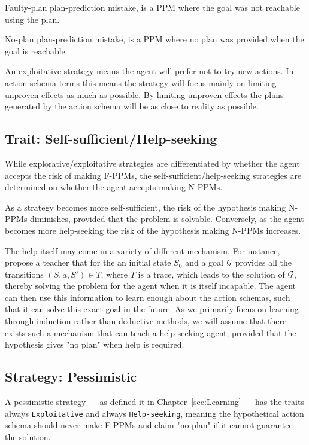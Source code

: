 \documentclass[\master/Master.tex]{subfiles}
\begin{document}
	\begin{definition} 
		[F-PPM] Faulty-plan plan-prediction mistake, is a PPM where the goal was not reachable using the plan.
	\end{definition}
	\begin{definition}
		[N-PPM] No-plan plan-prediction mistake, is a PPM where no plan was provided when the goal is reachable.
	\end{definition}
	An exploitative strategy means the agent will prefer not to try new actions.
	In action schema terms this means the strategy will focus mainly on limiting unproven effects as much as possible.
	By limiting unproven effects the plans generated by the action schema will be as close to reality as possible.

\subsection*{Trait: Self-sufficient/Help-seeking}

	While explorative/exploitative strategies are differentiated by whether the agent accepts the risk of making F-PPMs, the self-sufficient/help-seeking strategies are determined on whether the agent accepts making N-PPMs.

	As a strategy becomes more self-sufficient, the risk of the hypothesis making N-PPMs diminishes, provided that the problem is solvable.
	Conversely, as the agent becomes more help-seeking the risk of the hypothesis making N-PPMs increases.

	The help itself may come in a variety  of different mechanism.
	For instance, \cite{Walsh2008} propose a teacher that for the an initial state $S_0$ and a goal $\mathcal{G}$ provides all the transitions $(S,a,S') \in T$, where $T$ is a trace, which leads to the solution of $\mathcal{G}$,
	 thereby solving the problem for the agent when it is itself incapable.
	The agent can then use this information to learn enough about the action schemas, such that it can solve this exact goal in the future.
	As we primarily focus on learning through induction rather than deductive methods, we will assume that there exists such a mechanism that can teach a help-seeking agent;
	provided that the hypothesis gives "no plan" when help is required.

\subsection*{Strategy: Pessimistic}

	A pessimistic strategy --- as defined it in Chapter~\ref{sec:Learning} --- has the traits always \texttt{Exploitative} and always \texttt{Help-seeking},
	meaning the hypothetical action schema should never make F-PPMs and claim "no plan" if it cannot guarantee the solution.
\end{document}
